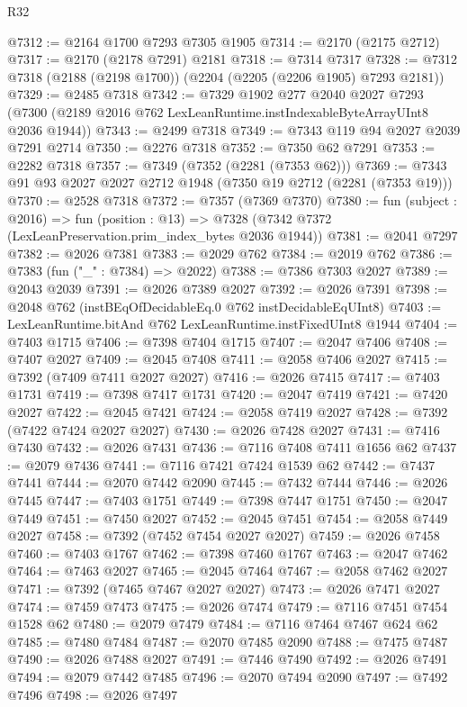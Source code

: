 \begin{lexlean}{R32}
\begin{coremodule}
@7312 := @2164 @1700 @7293 @7305 @1905
@7314 := @2170 (@2175 @2712)
@7317 := @2170 (@2178 @7291) @2181
@7318 := @7314 @7317
@7328 := @7312 @7318 (@2188 (@2198 @1700)) (@2204 (@2205 (@2206 @1905) @7293 @2181))
@7329 := @2485 @7318
@7342 := @7329
    @1902
    @277
    @2040
    @2027
    @7293
    (@7300 (@2189 @2016 @762 LexLeanRuntime.instIndexableByteArrayUInt8 @2036 @1944))
@7343 := @2499 @7318
@7349 := @7343 @119 @94 @2027 @2039 @7291 @2714
@7350 := @2276 @7318
@7352 := @7350 @62 @7291
@7353 := @2282 @7318
@7357 := @7349 (@7352 (@2281 (@7353 @62)))
@7369 := @7343 @91 @93 @2027 @2027 @2712 @1948 (@7350 @19 @2712 (@2281 (@7353 @19)))
@7370 := @2528 @7318
@7372 := @7357 (@7369 @7370)
@7380 := fun (subject : @2016) =>
  fun (position : @13) => @7328 (@7342 @7372 (LexLeanPreservation.prim_index_bytes @2036 @1944))
@7381 := @2041 @7297
@7382 := @2026 @7381
@7383 := @2029 @762
@7384 := @2019 @762
@7386 := @7383 (fun ("_" : @7384) => @2022)
@7388 := @7386 @7303 @2027
@7389 := @2043 @2039
@7391 := @2026 @7389 @2027
@7392 := @2026 @7391
@7398 := @2048 @762 (instBEqOfDecidableEq.{0} @762 instDecidableEqUInt8)
@7403 := LexLeanRuntime.bitAnd @762 LexLeanRuntime.instFixedUInt8 @1944
@7404 := @7403 @1715
@7406 := @7398 @7404 @1715
@7407 := @2047 @7406
@7408 := @7407 @2027
@7409 := @2045 @7408
@7411 := @2058 @7406 @2027
@7415 := @7392 (@7409 @7411 @2027 @2027)
@7416 := @2026 @7415
@7417 := @7403 @1731
@7419 := @7398 @7417 @1731
@7420 := @2047 @7419
@7421 := @7420 @2027
@7422 := @2045 @7421
@7424 := @2058 @7419 @2027
@7428 := @7392 (@7422 @7424 @2027 @2027)
@7430 := @2026 @7428 @2027
@7431 := @7416 @7430
@7432 := @2026 @7431
@7436 := @7116 @7408 @7411 @1656 @62
@7437 := @2079 @7436
@7441 := @7116 @7421 @7424 @1539 @62
@7442 := @7437 @7441
@7444 := @2070 @7442 @2090
@7445 := @7432 @7444
@7446 := @2026 @7445
@7447 := @7403 @1751
@7449 := @7398 @7447 @1751
@7450 := @2047 @7449
@7451 := @7450 @2027
@7452 := @2045 @7451
@7454 := @2058 @7449 @2027
@7458 := @7392 (@7452 @7454 @2027 @2027)
@7459 := @2026 @7458
@7460 := @7403 @1767
@7462 := @7398 @7460 @1767
@7463 := @2047 @7462
@7464 := @7463 @2027
@7465 := @2045 @7464
@7467 := @2058 @7462 @2027
@7471 := @7392 (@7465 @7467 @2027 @2027)
@7473 := @2026 @7471 @2027
@7474 := @7459 @7473
@7475 := @2026 @7474
@7479 := @7116 @7451 @7454 @1528 @62
@7480 := @2079 @7479
@7484 := @7116 @7464 @7467 @624 @62
@7485 := @7480 @7484
@7487 := @2070 @7485 @2090
@7488 := @7475 @7487
@7490 := @2026 @7488 @2027
@7491 := @7446 @7490
@7492 := @2026 @7491
@7494 := @2079 @7442 @7485
@7496 := @2070 @7494 @2090
@7497 := @7492 @7496
@7498 := @2026 @7497

\end{coremodule}
\end{lexlean}
